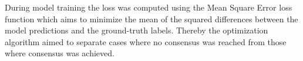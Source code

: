 During model training the loss was computed using the Mean Square Error loss function 
which aims to minimize the mean of the squared differences between the model predictions and the ground-truth labels.
Thereby the optimization algorithm aimed to separate cases where no consensus was reached from those where 
consensus was achieved.

